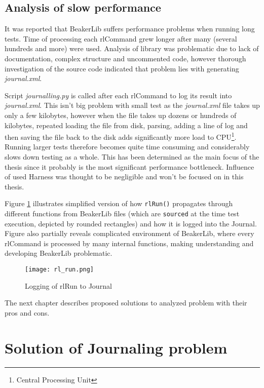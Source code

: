 \section{Analysis of slow performance}
It was reported that BeakerLib suffers performance problems when running long tests. Time of processing each rlCommand grew longer after many (several hundreds and more) were used. Analysis of library was problematic due to lack of documentation, complex structure and uncommented code, however thorough investigation of the source code indicated that problem lies with generating \textit{journal.xml}. 

Script \textit{journalling.py} is called after each rlCommand to log its result into \textit{journal.xml}. This isn't big problem with small test as the \textit{journal.xml} file takes up only a few kilobytes, however when the file takes up dozens or hundreds of kilobytes, repeated loading the file from disk, parsing, adding a line of log and then saving the file back to the disk adds significantly more load to CPU\footnote{Central Processing Unit}. Running larger tests therefore becomes quite time consuming and considerably slows down testing as a whole.
This has been determined as the main focus of the thesis since it probably is the most significant performance bottleneck. Influence of used Harness was thought  to be negligible and won't be focused on in this thesis.

Figure \ref{fig:rl_run} illustrates simplified version of how \texttt{rlRun()} propagates through different functions from BeakerLib files (which are \texttt{sourced} at the time test execution,  depicted by rounded rectangles) and how it is logged into the Journal. Figure also partially reveals complicated environment of BeakerLib, where every rlCommand is processed by many internal functions, making understanding and developing BeakerLib problematic. 

\begin{figure}[h!]
  \texttt{[image: rl\_run.png]}
  \caption{Logging of rlRun to Journal}
  \label{fig:rl_run}
\end{figure}


The next chapter describes proposed solutions to analyzed problem with their pros and cons.


\chapter{Solution of Journaling problem}
\label{solutions}

